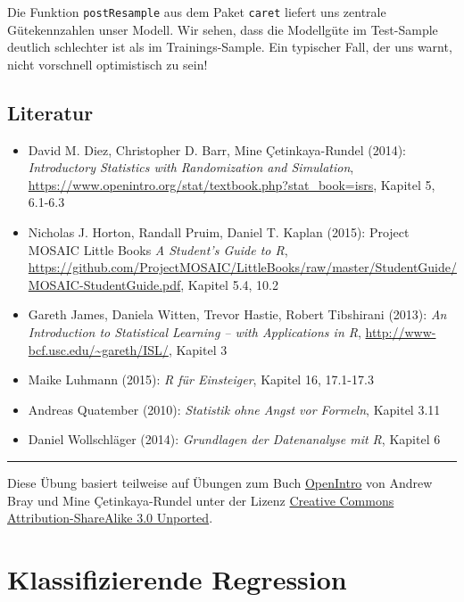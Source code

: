 \documentclass[12pt,]{book}
\providecommand{\tightlist}{%
  \setlength{\itemsep}{0pt}\setlength{\parskip}{0pt}}
\begin{document}
Die Funktion \texttt{postResample} aus dem Paket \texttt{caret} liefert
uns zentrale Gütekennzahlen unser Modell. Wir sehen, dass die Modellgüte
im Test-Sample deutlich schlechter ist als im Trainings-Sample. Ein
typischer Fall, der uns warnt, nicht vorschnell optimistisch zu sein!

\section{Literatur}\label{literatur}

\begin{itemize}
\tightlist
\item
  David M. Diez, Christopher D. Barr, Mine Çetinkaya-Rundel (2014):
  \emph{Introductory Statistics with Randomization and Simulation},
  \url{https://www.openintro.org/stat/textbook.php?stat_book=isrs},
  Kapitel 5, 6.1-6.3
\item
  Nicholas J. Horton, Randall Pruim, Daniel T. Kaplan (2015): Project
  MOSAIC Little Books \emph{A Student's Guide to R},
  \url{https://github.com/ProjectMOSAIC/LittleBooks/raw/master/StudentGuide/MOSAIC-StudentGuide.pdf},
  Kapitel 5.4, 10.2
\item
  Gareth James, Daniela Witten, Trevor Hastie, Robert Tibshirani (2013):
  \emph{An Introduction to Statistical Learning -- with Applications in
  R}, \url{http://www-bcf.usc.edu/~gareth/ISL/}, Kapitel 3
\item
  Maike Luhmann (2015): \emph{R für Einsteiger}, Kapitel 16, 17.1-17.3
\item
  Andreas Quatember (2010): \emph{Statistik ohne Angst vor Formeln},
  Kapitel 3.11
\item
  Daniel Wollschläger (2014): \emph{Grundlagen der Datenanalyse mit R},
  Kapitel 6
\end{itemize}

\begin{center}\rule{0.5\linewidth}{\linethickness}\end{center}

Diese Übung basiert teilweise auf Übungen zum Buch
\href{https://www.openintro.org/stat/index.php?stat_book=isrs}{OpenIntro}
von Andrew Bray und Mine Çetinkaya-Rundel unter der Lizenz
\href{http://creativecommons.org/licenses/by-sa/3.0}{Creative Commons
Attribution-ShareAlike 3.0 Unported}.

\chapter{Klassifizierende Regression}\label{klassifizierende-regression}
\end{document}
